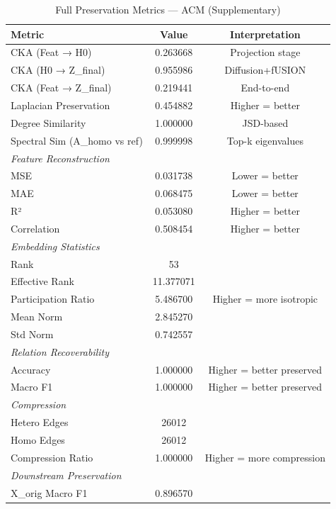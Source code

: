 \begin{landscape}
\begin{table}[h]
\centering
\caption{Full Preservation Metrics — ACM (Supplementary)}
\label{tab:supp_acm}
\begin{tabular}{lcc}
\toprule
\textbf{Metric} & \textbf{Value} & \textbf{Interpretation} \\
\midrule
CKA (Feat → H0) & 0.263668 & Projection stage \\
CKA (H0 → Z_final) & 0.955986 & Diffusion+fUSION \\
CKA (Feat → Z_final) & 0.219441 & End-to-end \\
Laplacian Preservation & 0.454882 & Higher = better \\
Degree Similarity & 1.000000 & JSD-based \\
Spectral Sim (A_homo vs ref) & 0.999998 & Top-k eigenvalues \\
\midrule
\multicolumn{3}{l}{\textit{Feature Reconstruction}} \\
MSE & 0.031738 & Lower = better \\
MAE & 0.068475 & Lower = better \\
R² & 0.053080 & Higher = better \\
Correlation & 0.508454 & Higher = better \\
\midrule
\multicolumn{3}{l}{\textit{Embedding Statistics}} \\
Rank & 53 &  \\
Effective Rank & 11.377071 &  \\
Participation Ratio & 5.486700 & Higher = more isotropic \\
Mean Norm & 2.845270 &  \\
Std Norm & 0.742557 &  \\
\midrule
\multicolumn{3}{l}{\textit{Relation Recoverability}} \\
Accuracy & 1.000000 & Higher = better preserved \\
Macro F1 & 1.000000 & Higher = better preserved \\
\midrule
\multicolumn{3}{l}{\textit{Compression}} \\
Hetero Edges & 26012 &  \\
Homo Edges & 26012 &  \\
Compression Ratio & 1.000000 & Higher = more compression \\
\midrule
\multicolumn{3}{l}{\textit{Downstream Preservation}} \\
X_orig Macro F1 & 0.896570 &  \\

\end{tabular}
\end{table}
\end{landscape}
